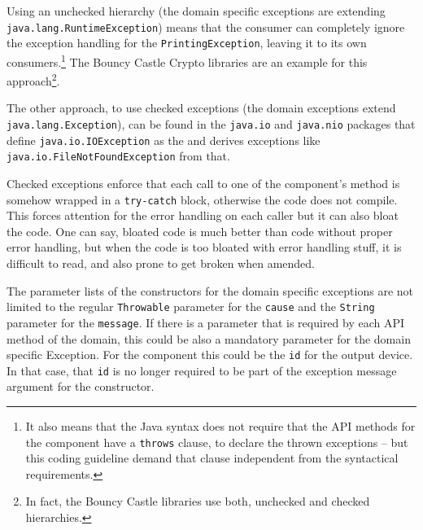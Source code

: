 Using an unchecked hierarchy (the domain specific exceptions are extending \lstinline|java.lang.RuntimeException|) means that the consumer can completely ignore the exception handling for the \lstinline|PrintingException|, leaving it to its own consumers.\footnote{It also means that the Java syntax does not require that the API methods for the  component have a \lstinline|throws| clause, to declare the thrown exceptions – but this coding guideline demand that clause independent from the syntactical requirements.} The Bouncy Castle Crypto libraries \autocite{BouncyCastle,BouncyCastle:RuntimeCryptoException_CLASS} are an example for this approach\footnote{In fact, the Bouncy Castle libraries use both, unchecked and checked hierarchies.}.

The other approach, to use checked exceptions (the domain exceptions extend \lstinline|java.lang.Exception|), can be found in the \lstinline|java.io| \autocite{ORACLE_DOC_IO_PACKAGE} and \lstinline|java.nio| \autocite{ORACLE_DOC_NIO_PACKAGE} packages that define \lstinline|java.io.IOException| \autocite{ORACLE_DOC_IOEXCEPTION_CLASS} as the  and derives exceptions like \lstinline|java.io.FileNotFoundException| \autocite{ORACLE_DOC_FILENOTFOUNDEXCEPTION_CLASS} from that.

Checked exceptions enforce that each call to one of the component's method is somehow wrapped in a \texttt{try-catch} block, otherwise the code does not compile. This forces attention for the error handling on each caller but it can also bloat the code. One can say, bloated code is much better than code without proper error handling, but when the code is too bloated with error handling stuff, it is difficult to read, and also prone to get broken when amended.

The parameter lists of the constructors for the domain specific exceptions are not limited to the regular \lstinline|Throwable| parameter for the \texttt{cause} and the \lstinline|String| parameter for the \texttt{message}. If there is a parameter that is required by each API method of the domain, this could be also a mandatory parameter for the domain specific Exception. For the  component this could be the \texttt{id} for the output device. In that case, that \texttt{id} is no longer required to be part of the exception message argument for the constructor.


